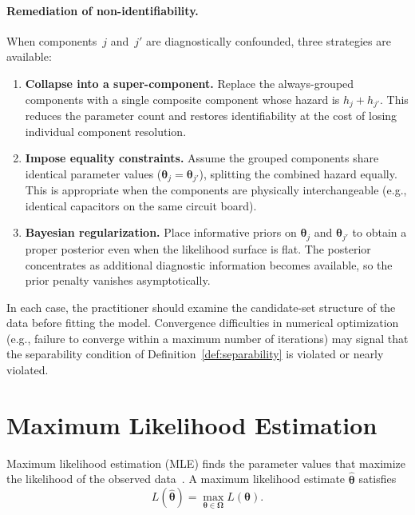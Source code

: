 \documentclass[11pt]{article}
\theoremstyle{definition}
\theoremstyle{plain}
\renewcommand{\v}[1]{\boldsymbol{#1}}
\newcommand{\btheta}{\v{\theta}}
\newcommand{\bomega}{\v{\Omega}}
\begin{document}
\paragraph{Remediation of non-identifiability.}
When components~$j$ and~$j'$ are diagnostically confounded, three
strategies are available:
\begin{enumerate}
    \item \textbf{Collapse into a super-component.}
    Replace the always-grouped components with a single composite
    component whose hazard is $h_j + h_{j'}$.
    This reduces the parameter count and restores identifiability at the
    cost of losing individual component resolution.
    \item \textbf{Impose equality constraints.}
    Assume the grouped components share identical parameter
    values ($\v{\theta}_j = \v{\theta}_{j'}$), splitting the combined
    hazard equally.
    This is appropriate when the components are physically
    interchangeable (e.g., identical capacitors on the same circuit
    board).
    \item \textbf{Bayesian regularization.}
    Place informative priors on $\v{\theta}_j$ and $\v{\theta}_{j'}$ to
    obtain a proper posterior even when the likelihood surface is flat.
    The posterior concentrates as additional diagnostic information becomes
    available, so the prior penalty vanishes asymptotically.
\end{enumerate}
In each case, the practitioner should examine the candidate-set
structure of the data before fitting the model.
Convergence difficulties in numerical optimization (e.g., failure to
converge within a maximum number of iterations) may signal that the
separability condition of Definition~\ref{def:separability} is
violated or nearly violated.


\section{Maximum Likelihood Estimation}
\label{sec:mle}

Maximum likelihood estimation (MLE) finds the parameter values that
maximize the likelihood of the observed
data~\citep{bain1992,casella2002statistical}.
A maximum likelihood estimate $\hat{\btheta}$ satisfies
\begin{equation}
\label{eq:mle-def}
    L(\hat{\btheta}) = \max_{\btheta \in \bomega} L(\btheta).
\end{equation}
\end{document}

